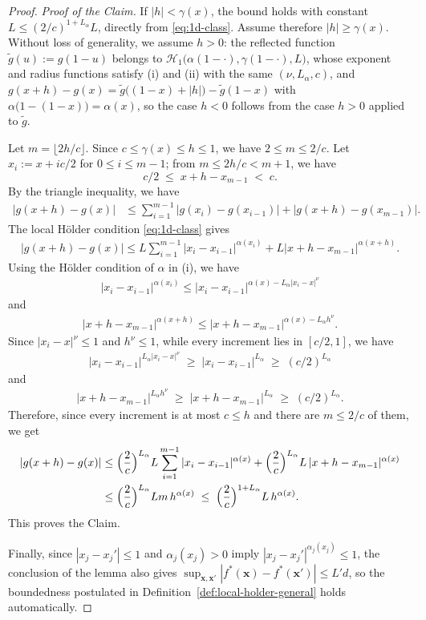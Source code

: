 \documentclass[10pt,a4paper]{amsart}
\newcommand{\bx}{\mathbf{x}}
\begin{document}
\begin{proof}
\medskip
\noindent\emph{Proof of the Claim.} If $\lvert h\rvert<\gamma(x)$, the
bound holds with constant $L\le (2/c)^{1+L_\alpha}L$, directly from
\eqref{eq:1d-class}. Assume therefore $\lvert h\rvert\ge\gamma(x)$.
Without loss of generality, we assume $h>0$: the reflected function
$\tilde g(u):=g(1-u)$ belongs to
$\mathcal{H}_1\bigl(\alpha(1-\cdot),\gamma(1-\cdot),L\bigr)$,
whose exponent and radius functions satisfy (i) and (ii) with the same
$(\nu,L_\alpha,c)$, and
$g(x+h)-g(x)=\tilde g\bigl((1-x)+\lvert h\rvert\bigr)-\tilde g(1-x)$
with $\alpha\bigl(1-(1-x)\bigr)=\alpha(x)$, so the case $h<0$ follows
from the case $h>0$ applied to $\tilde g$.

Let $m=\lfloor 2h/c\rfloor$. Since $c\le\gamma(x)\le h\le 1$, we have
$2\le m\le 2/c$. Let $x_i:=x+ic/2$ for $0\le i\le m-1$; from
$m\le 2h/c<m+1$, we have
\[
  c/2 \;\le\; x+h-x_{m-1} \;<\; c .
\]
By the triangle inequality, we have
\begin{align*}
|g(x+h)-g(x)|&\leq \sum_{i=1}^{m-1} |g(x_i)-g(x_{i-1})|
  + |g(x+h)-g(x_{m-1})|.
\end{align*}
The local
H\"older condition \eqref{eq:1d-class} gives
\begin{align*}
|g(x+h)-g(x)|\leq L\sum_{i=1}^{m-1}|x_i-x_{i-1}|^{\alpha(x_i)}
  + L|x+h-x_{m-1}|^{\alpha(x+h)}.
\end{align*}
Using the H\"older condition of $\alpha$ in (i), we have
\begin{align*}
|x_i-x_{i-1}|^{\alpha(x_i)}\leq
|x_i-x_{i-1}|^{\alpha(x)-L_\alpha|x_i-x|^{\nu}}
\end{align*}
and
\begin{align*}
|x+h-x_{m-1}|^{\alpha(x+h)}\leq
|x+h-x_{m-1}|^{\alpha(x)-L_\alpha h^{\nu}}.
\end{align*}
Since $|x_i-x|^{\nu}\le 1$ and $h^{\nu}\le 1$, while every increment
lies in $[c/2,1]$, we have
\begin{align*}
|x_i-x_{i-1}|^{L_\alpha|x_i-x|^{\nu}}
\;\geq\; |x_i-x_{i-1}|^{L_\alpha}
\;\geq\; (c/2)^{L_\alpha}
\end{align*}
and
\begin{align*}
|x+h-x_{m-1}|^{L_\alpha h^{\nu}}
\;\geq\; |x+h-x_{m-1}|^{L_\alpha}
\;\geq\; (c/2)^{L_\alpha}.
\end{align*}
Therefore, since every increment is at most $c\le h$ and there are
$m\le 2/c$ of them, we get
\begin{align*}
|g(x+h)-g(x)|& \leq
\Bigl(\frac{2}{c}\Bigr)^{L_\alpha}
L\sum_{i=1}^{m-1}|x_i-x_{i-1}|^{\alpha(x)}
  + \Bigl(\frac{2}{c}\Bigr)^{L_\alpha} L\,
  |x+h-x_{m-1}|^{\alpha(x)}\\
& \leq \Bigl(\frac{2}{c}\Bigr)^{L_\alpha} L m\, h^{\alpha(x)}
\;\leq\; \Bigl(\frac{2}{c}\Bigr)^{1+L_\alpha} L\, h^{\alpha(x)}.
\end{align*}
This proves the Claim.

\medskip
Finally, since $|x_j-x_j'|\le 1$ and $\alpha_j(x_j)>0$ imply
$|x_j-x_j'|^{\alpha_j(x_j)}\le1$, the conclusion of the lemma also
gives $\sup_{\bx,\bx'}|f^*(\bx)-f^*(\bx')|\le L'd$, so the boundedness
postulated in Definition~\ref{def:local-holder-general} holds
automatically.
\end{proof}
\end{document}
